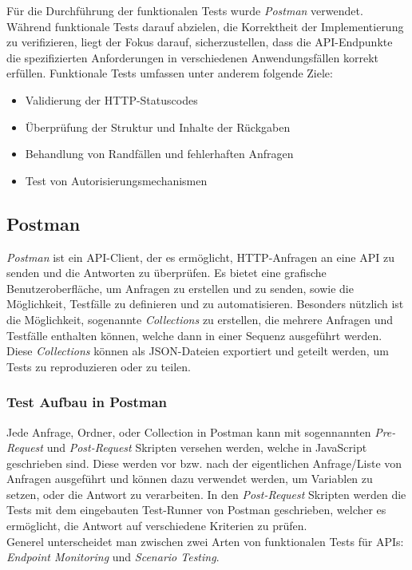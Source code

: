 Für die Durchführung der funktionalen Tests wurde \textit{Postman} verwendet.\\

Während funktionale Tests darauf abzielen, die Korrektheit der Implementierung zu verifizieren, 
liegt der Fokus darauf, sicherzustellen, dass die \ac{API}-Endpunkte die spezifizierten Anforderungen 
in verschiedenen Anwendungsfällen korrekt erfüllen. Funktionale Tests umfassen unter anderem folgende Ziele:

\begin{itemize}
    \item Validierung der HTTP-Statuscodes
    \item Überprüfung der Struktur und Inhalte der Rückgaben
    \item Behandlung von Randfällen und fehlerhaften Anfragen
    \item Test von Autorisierungsmechanismen
\end{itemize}

\subsection{Postman}

\textit{Postman} ist ein \ac{API}-Client, der es ermöglicht, HTTP-Anfragen an eine \ac{API} zu senden und die Antworten zu überprüfen.
Es bietet eine grafische Benutzeroberfläche, um Anfragen zu erstellen und zu senden, sowie die Möglichkeit, Testfälle zu definieren und zu automatisieren.
Besonders nützlich ist die Möglichkeit, sogenannte \textit{Collections} zu erstellen, die mehrere Anfragen und Testfälle enthalten können, welche dann in 
einer Sequenz ausgeführt werden.
Diese \textit{Collections} können als \ac{JSON}-Dateien exportiert und geteilt werden, um Tests zu reproduzieren oder zu teilen.

\subsubsection*{Test Aufbau in Postman}

Jede Anfrage, Ordner, oder Collection in Postman kann mit sogennannten \textit{Pre-Request} und \textit{Post-Request} Skripten versehen werden, welche in JavaScript geschrieben sind.
Diese werden vor bzw. nach der eigentlichen Anfrage/Liste von Anfragen ausgeführt und können dazu verwendet werden, um Variablen zu setzen, oder die Antwort zu verarbeiten.
In den \textit{Post-Request} Skripten werden die Tests mit dem eingebauten Test-Runner von Postman geschrieben, welcher es ermöglicht, die Antwort auf verschiedene Kriterien zu prüfen.\\
Generel unterscheidet man zwischen zwei Arten von funktionalen Tests für \ac{API}s: \textit{Endpoint Monitoring} und \textit{Scenario Testing}.

